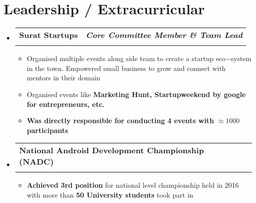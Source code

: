 \documentclass[letterpaper,11pt, ]{article}
\makeatletter
\newcommand{\resumeItem}[1]{
  \item[\bullet]\small{
    {#1 \vspace{-2pt}}
  }
}
\newcommand{\resumeResultItem}[1]{
  \item[\checkmark]\small{
    {#1 \vspace{-2pt}}
  }
}
\newcommand{\resumeSubheading}[4]{
  \vspace{-2pt}\item
    \begin{tabular*}{1.0\textwidth}[t]{l@{\extracolsep{\fill}}r}
      \textbf{#1} & \textbf{\small #2} \\
      \textit{\small#3} & \textit{\small #4} \\
    \end{tabular*}\vspace{-7pt}
}
\newcommand{\resumeSubHeadingListStart}{\begin{itemize}[leftmargin=0.0in, label={}]}
\newcommand{\resumeSubHeadingListEnd}{\end{itemize}}
\newcommand{\resumeItemListStart}{\begin{itemize}[leftmargin=10pt]}
\newcommand{\resumeItemListEnd}{\end{itemize}\vspace{-5pt}}
\makeatother
\begin{document}
\section{Leadership / Extracurricular}
    \resumeSubHeadingListStart
        \resumeSubheading{Surat Startups}{ \textit{Core Committee Member \& Team Lead}}{}{}
    \vspace{-15pt}
        \resumeItemListStart
            \resumeItem{Organised multiple events along side team to create a startup eco$-$system in the town. Empowered small business to grow and connect with mentors in their domain}
            \resumeItem{Organised events like \textbf{Marketing Hunt, Startupweekend by google for entrepreneurs, etc.}}
            \resumeResultItem{\textbf{Was directly responsible for conducting 4 events with  $\approx1000$ participants}}
        \resumeItemListEnd
    \resumeSubheading{National Android Development Championship (NADC)}{}{}{}
    \vspace{-15pt}
        \resumeItemListStart
            \resumeResultItem{\textbf{Achieved 3rd position} for national level championship held in 2016 with more than \textbf{50 University students} took part in}
        \resumeItemListEnd

  
    \resumeSubHeadingListEnd
\end{document}
